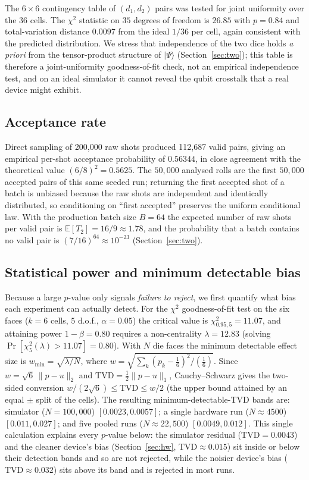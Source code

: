 \documentclass{ieeeaccess}
\begin{document}
The $6\times 6$ contingency table of $(d_1,d_2)$ pairs was tested for joint uniformity over the $36$ cells. The $\chi^2$ statistic on $35$ degrees of freedom is $26.85$ with $p=0.84$ and total-variation distance $0.0097$ from the ideal $1/36$ per cell, again consistent with the predicted distribution. We stress that independence of the two dice holds \emph{a priori} from the tensor-product structure of $|\Psi\rangle$ (Section~\ref{sec:two}); this table is therefore a joint-uniformity goodness-of-fit check, not an empirical independence test, and on an ideal simulator it cannot reveal the qubit crosstalk that a real device might exhibit.

\subsection{Acceptance rate}

Direct sampling of 200{,}000 raw shots produced 112{,}687 valid pairs, giving an empirical per-shot acceptance probability of $0.56344$, in close agreement with the theoretical value $(6/8)^2=0.5625$. The $50{,}000$ analysed rolls are the first $50{,}000$ accepted pairs of this same seeded run; returning the first accepted shot of a batch is unbiased because the raw shots are independent and identically distributed, so conditioning on ``first accepted'' preserves the uniform conditional law. With the production batch size $B=64$ the expected number of raw shots per valid pair is $\mathbb{E}[T_2]=16/9\approx 1.78$, and the probability that a batch contains no valid pair is $(7/16)^{64}\approx 10^{-23}$ (Section~\ref{sec:two}).

\subsection{Statistical power and minimum detectable bias}
\label{sec:power}

Because a large $p$-value only signals \emph{failure to reject}, we first quantify what bias each experiment can actually detect. For the $\chi^2$ goodness-of-fit test on the six faces ($k=6$ cells, $5$ d.o.f., $\alpha=0.05$) the critical value is $\chi^2_{0.95,5}=11.07$, and attaining power $1-\beta=0.80$ requires a non-centrality $\lambda=12.83$ (solving $\Pr[\chi^2_5(\lambda)>11.07]=0.80$). With $N$ die faces the minimum detectable effect size is $w_{\min}=\sqrt{\lambda/N}$, where $w=\sqrt{\sum_{k}(p_k-\tfrac16)^2/(\tfrac16)}$. Since $w=\sqrt{6}\,\lVert p-u\rVert_2$ and $\mathrm{TVD}=\tfrac12\lVert p-u\rVert_1$, Cauchy--Schwarz gives the two-sided conversion $w/(2\sqrt{6})\le\mathrm{TVD}\le w/2$ (the upper bound attained by an equal $\pm$ split of the cells). The resulting minimum-detectable-TVD bands are: simulator ($N=100{,}000$) $[0.0023,0.0057]$; a single hardware run ($N\approx4500$) $[0.011,0.027]$; and five pooled runs ($N\approx22{,}500$) $[0.0049,0.012]$. This single calculation explains every $p$-value below: the simulator residual ($\mathrm{TVD}=0.0043$) and the cleaner device's bias (Section~\ref{sec:hw}, $\mathrm{TVD}\approx0.015$) sit inside or below their detection bands and so are not rejected, while the noisier device's bias ($\mathrm{TVD}\approx0.032$) sits above its band and is rejected in most runs.
\end{document}
